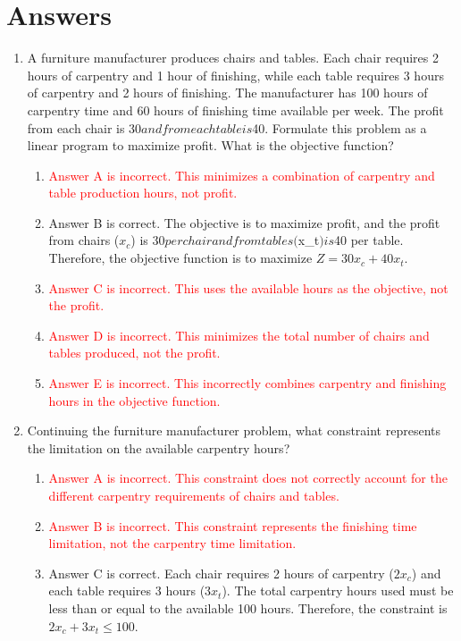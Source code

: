 \documentclass{article}%
\newcommand{\incorrect}[1]{\textcolor{red}{#1}}
\begin{document}
\section{Answers}%
\label{sec:Answers}%
\begin{enumerate}%
\item A furniture manufacturer produces chairs and tables. Each chair requires 2 hours of carpentry and 1 hour of finishing, while each table requires 3 hours of carpentry and 2 hours of finishing. The manufacturer has 100 hours of carpentry time and 60 hours of finishing time available per week.  The profit from each chair is $30 and from each table is $40. Formulate this problem as a linear program to maximize profit. What is the objective function?%
\begin{enumerate}%
\item \incorrect{Answer A is incorrect. This minimizes a combination of carpentry and table production hours, not profit.}%
\item Answer B is correct. The objective is to maximize profit, and the profit from chairs ($x_c$) is $30 per chair and from tables ($x_t$) is $40 per table. Therefore, the objective function is to maximize $Z = 30x_c + 40x_t$.%
\item \incorrect{Answer C is incorrect. This uses the available hours as the objective, not the profit.}%
\item \incorrect{Answer D is incorrect. This minimizes the total number of chairs and tables produced, not the profit.}%
\item \incorrect{Answer E is incorrect. This incorrectly combines carpentry and finishing hours in the objective function.}%
\end{enumerate}%
\vspace{1em}%
\item Continuing the furniture manufacturer problem, what constraint represents the limitation on the available carpentry hours?%
\begin{enumerate}%
\item \incorrect{Answer A is incorrect. This constraint does not correctly account for the different carpentry requirements of chairs and tables.}%
\item \incorrect{Answer B is incorrect. This constraint represents the finishing time limitation, not the carpentry time limitation.}%
\item Answer C is correct. Each chair requires 2 hours of carpentry ($2x_c$) and each table requires 3 hours ($3x_t$). The total carpentry hours used must be less than or equal to the available 100 hours.  Therefore, the constraint is $2x_c + 3x_t \le 100$.%

\end{enumerate}
\end{enumerate}
\end{document}
